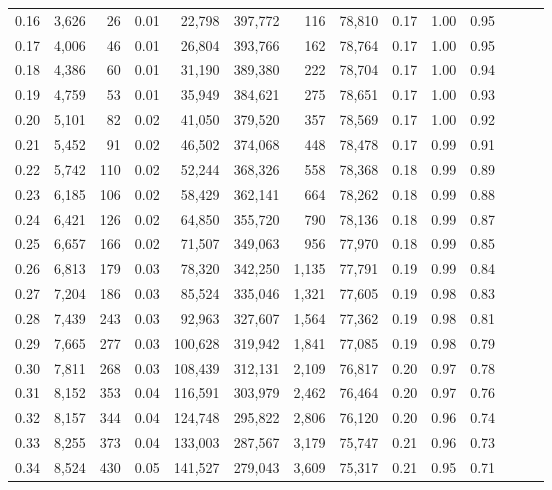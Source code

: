 \begin{tabular}{rrrrrrrrrrrrrr}
0.16 &  3,626 &     26 &  0.01 &   22,798 &  397,772 &     116 &  78,810 &  0.17 &  1.00 &      0.95 \\
0.17 &  4,006 &     46 &  0.01 &   26,804 &  393,766 &     162 &  78,764 &  0.17 &  1.00 &      0.95 \\
0.18 &  4,386 &     60 &  0.01 &   31,190 &  389,380 &     222 &  78,704 &  0.17 &  1.00 &      0.94 \\
0.19 &  4,759 &     53 &  0.01 &   35,949 &  384,621 &     275 &  78,651 &  0.17 &  1.00 &      0.93 \\
0.20 &  5,101 &     82 &  0.02 &   41,050 &  379,520 &     357 &  78,569 &  0.17 &  1.00 &      0.92 \\
0.21 &  5,452 &     91 &  0.02 &   46,502 &  374,068 &     448 &  78,478 &  0.17 &  0.99 &      0.91 \\
0.22 &  5,742 &    110 &  0.02 &   52,244 &  368,326 &     558 &  78,368 &  0.18 &  0.99 &      0.89 \\
0.23 &  6,185 &    106 &  0.02 &   58,429 &  362,141 &     664 &  78,262 &  0.18 &  0.99 &      0.88 \\
0.24 &  6,421 &    126 &  0.02 &   64,850 &  355,720 &     790 &  78,136 &  0.18 &  0.99 &      0.87 \\
0.25 &  6,657 &    166 &  0.02 &   71,507 &  349,063 &     956 &  77,970 &  0.18 &  0.99 &      0.85 \\
0.26 &  6,813 &    179 &  0.03 &   78,320 &  342,250 &   1,135 &  77,791 &  0.19 &  0.99 &      0.84 \\
0.27 &  7,204 &    186 &  0.03 &   85,524 &  335,046 &   1,321 &  77,605 &  0.19 &  0.98 &      0.83 \\
0.28 &  7,439 &    243 &  0.03 &   92,963 &  327,607 &   1,564 &  77,362 &  0.19 &  0.98 &      0.81 \\
0.29 &  7,665 &    277 &  0.03 &  100,628 &  319,942 &   1,841 &  77,085 &  0.19 &  0.98 &      0.79 \\
0.30 &  7,811 &    268 &  0.03 &  108,439 &  312,131 &   2,109 &  76,817 &  0.20 &  0.97 &      0.78 \\
0.31 &  8,152 &    353 &  0.04 &  116,591 &  303,979 &   2,462 &  76,464 &  0.20 &  0.97 &      0.76 \\
0.32 &  8,157 &    344 &  0.04 &  124,748 &  295,822 &   2,806 &  76,120 &  0.20 &  0.96 &      0.74 \\
0.33 &  8,255 &    373 &  0.04 &  133,003 &  287,567 &   3,179 &  75,747 &  0.21 &  0.96 &      0.73 \\
0.34 &  8,524 &    430 &  0.05 &  141,527 &  279,043 &   3,609 &  75,317 &  0.21 &  0.95 &      0.71 \\

\end{tabular}
